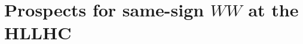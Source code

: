 \chapter[Prospects for same-sign $WW$ at the HLLHC][Prospects for same-sign $WW$ at the HLLHC]{Prospects for same-sign $WW$ at the HLLHC}
\label{ch:sswwupgrade}



